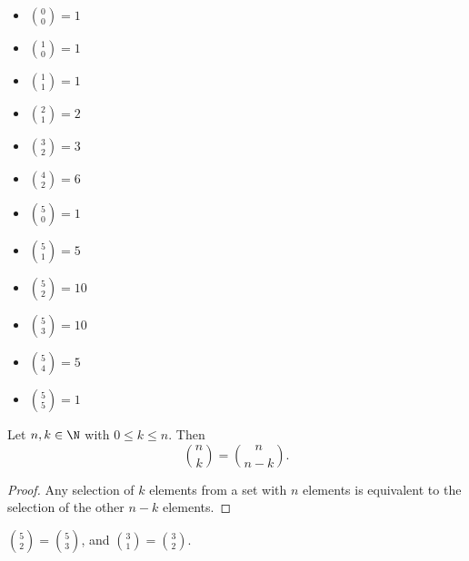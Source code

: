 \documentclass[12pt]{article}
\begin{document}
\begin{exmp}\proofbreak
    \begin{multicols}{2}
        \begin{itemize}
            \item $\binom{0}{0} = 1$
            \item $\binom{1}{0} = 1$
            \item $\binom{1}{1} = 1$
            \item $\binom{2}{1} = 2$
            \item $\binom{3}{2} = 3$
            \item $\binom{4}{2} = 6$
        \end{itemize}

        \columnbreak

        \begin{itemize}
            \item $\binom{5}{0} = 1$
            \item $\binom{5}{1} = 5$
            \item $\binom{5}{2} = 10$
            \item $\binom{5}{3} = 10$
            \item $\binom{5}{4} = 5$
            \item $\binom{5}{5} = 1$
        \end{itemize}
    \end{multicols}
\end{exmp}

\begin{prop}\label{binomial-complement}
    Let $n, k \in \N$ with $0 \leq k \leq n$. Then \[\binom{n}{k} = \binom{n}{n-k}.\]
\end{prop}

\begin{proof}
    Any selection of $k$ elements from a set with $n$ elements is equivalent to the selection of the other $n-k$ elements.
\end{proof}

\begin{exmp}
    $\binom{5}{2} = \binom{5}{3}$, and $\binom{3}{1} = \binom{3}{2}$.
\end{exmp}
\end{document}
